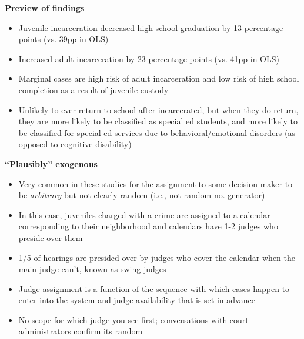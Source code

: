 \documentclass[notes=show]{beamer}
\begin{document}
\begin{frame}[plain]
\begin{center}
\textbf{Preview of findings}
\end{center}

	\begin{itemize}
	\item Juvenile incarceration decreased high school graduation by 13 percentage points (vs. 39pp in OLS)
	\item Increased adult incarceration by 23 percentage points (vs. 41pp in OLS)
	\item Marginal cases are high risk of adult incarceration and low risk of high school completion as a result of juvenile custody
	\item Unlikely to ever return to school after incarcerated, but when they do return, they are more likely to be classified as special ed students, and more likely to be classified for special ed services due to behavioral/emotional disorders (as opposed to cognitive disability)
	\end{itemize}
	
\end{frame}

\begin{frame}[plain]
\begin{center}
\textbf{``Plausibly'' exogenous}
\end{center}

	\begin{itemize}
	\item Very common in these studies for the assignment to some decision-maker to be \emph{arbitrary} but not clearly random (i.e., not random no. generator)
	\item In this case, juveniles charged with a crime are assigned to a calendar corresponding to their neighborhood and calendars have 1-2 judges who preside over them
	\item 1/5 of hearings are presided over by judges who cover the calendar when the main judge can't, known as swing judges
	\item Judge assignment is a function of the sequence with which cases happen to enter into the system and judge availability that is set in advance
	\item No scope for which judge you see first; conversations with court administrators confirm its random
	\end{itemize}
\end{frame}
\end{document}
